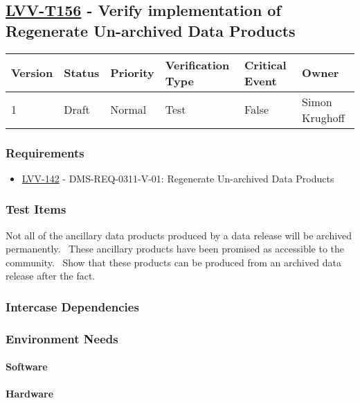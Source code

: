 \subsection{\href{https://jira.lsstcorp.org/secure/Tests.jspa\#/testCase/LVV-T156}{LVV-T156}
    - Verify implementation of Regenerate Un-archived Data Products}\label{lvv-t156}

\begin{longtable}[]{llllll}
\toprule
Version & Status & Priority & Verification Type & Critical Event & Owner
\\\midrule
1 & Draft & Normal &
Test & False & Simon Krughoff
\\\bottomrule
\end{longtable}

\subsubsection{Requirements}
\begin{itemize}
\item \href{https://jira.lsstcorp.org/browse/LVV-142}{LVV-142} - DMS-REQ-0311-V-01: Regenerate Un-archived Data Products
\end{itemize}

\subsubsection{Test Items}
Not all of the ancillary data products produced by a data release will
be archived permanently. ~These ancillary products have been promised as
accessible to the community.~ Show that these products can be produced
from an archived data release after the fact.



\subsubsection{Intercase Dependencies}

\subsubsection{Environment Needs}

\paragraph{Software}

\paragraph{Hardware}

